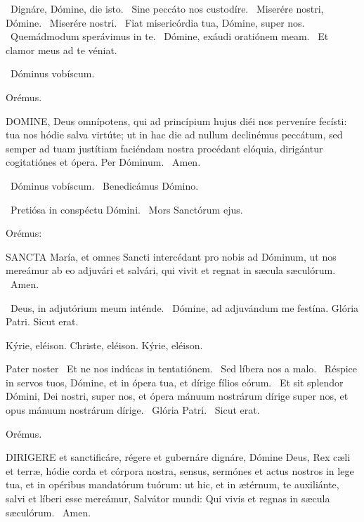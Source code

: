 
\V\ Dignáre, Dómine, die isto. \R\ Sine peccáto nos custodíre. \V\ Miserére nostri, Dómine. \R\ Miserére nostri. \V\ Fiat misericórdia tua, Dómine, super nos. \R\ Quemádmodum sperávimus in te. \V\ Dómine, exáudi oratiónem meam. \R\ Et clamor meus ad te véniat.

\V\ Dóminus vobíscum.

Orémus. 

\lettrine[lines=2]{D}{OMINE}, Deus omnípotens, qui ad princípium hujus diéi nos perveníre fecísti: tua nos hódie salva virtúte; ut in hac die ad nullum declinémus peccátum, sed semper ad tuam justítiam faciéndam nostra procédant elóquia, dirigántur cogitatiónes et ópera. Per Dóminum. \R\ Amen.

\V\ Dóminus vobíscum. \V\ Benedicámus Dómino.


\V\ Pretiósa in conspéctu Dómini. \R\ Mors Sanctórum ejus.

 Orémus:


\lettrine[lines=2]{S}{ANCTA} María, et omnes Sancti intercédant pro nobis ad Dóminum, ut nos mereámur ab eo adjuvári et salvári, qui vivit et regnat in sæcula sæculórum. \R\ Amen.

\V\ Deus, in adjutórium meum inténde. \R\ Dómine, ad adjuvándum me festína.  Glória Patri. Sicut erat.

Kýrie, eléison. Christe, eléison. Kýrie, eléison.

Pater noster  \V\ Et ne nos indúcas in tentatiónem. \R\ Sed líbera nos a malo. \V\ Réspice in servos tuos, Dómine, et in ópera tua, et dírige fílios eórum. \R\ Et sit splendor Dómini, Dei nostri, super nos, et ópera mánuum nostrárum dírige super nos, et opus mánuum nostrárum dírige. \V\ Glória Patri. \R\ Sicut erat.

Orémus. 

\lettrine[lines=2]{D}{IRIGERE} et sanctificáre, régere et gubernáre dignáre, Dómine Deus, Rex cæli et terræ, hódie corda et córpora nostra, sensus, sermónes et actus nostros in lege tua, et in opéribus mandatórum tuórum: ut hic, et in ætérnum, te auxiliánte, salvi et líberi esse mereámur, Salvátor mundi: Qui vivis et regnas in sæcula sæculórum. \R\ Amen.

